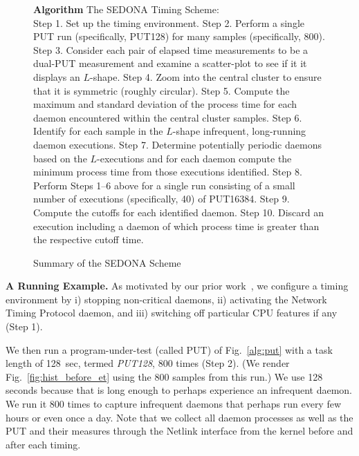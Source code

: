 \documentclass[letter]{ieice}
\begin{document}
\begin{figure}[h]
\begin{center}
\begin{algorithmic}
{\bf Algorithm} The SEDONA Timing Scheme: \\
\STATE Step 1. Set up the timing environment.
\STATE Step 2. Perform a single PUT run (specifically, PUT128) for many samples (specifically, 800).
\STATE Step 3. Consider each pair of elapsed time measurements to be a
dual-PUT measurement 
and examine a scatter-plot to see if it it displays an $L$-shape.
\STATE Step 4. Zoom into the central cluster to ensure that it is symmetric (roughly circular).
\STATE Step 5. Compute the maximum and standard deviation of the process time 
for each daemon encountered within the central cluster samples.
\STATE Step 6. Identify for each sample in the $L$-shape infrequent, long-running daemon executions. 
\STATE Step 7. Determine potentially periodic daemons based on the $L$-executions 
and for each daemon compute the minimum process time from those executions identified. 
\STATE Step 8. Perform Steps 1--6 above for a single run 
consisting of a small number of executions (specifically, 40) of PUT16384.  
\STATE Step 9. Compute the cutoffs for each identified daemon. 
\STATE Step 10. Discard an execution including a daemon of which process
time is greater than the respective cutoff time.
\end{algorithmic}
\end{center}
\caption{Summary of the SEDONA Scheme\label{alg:find}}
\vspace{-0.28in}
\end{figure}
%


{\bf A Running Example.} 
As motivated by our prior work~\cite{Currim}, 
we configure a timing environment by i) stopping non-critical daemons, 
ii) activating the Network Timing Protocol daemon, and 
iii) switching off particular CPU features\cite{intel15,intelSpeed15} if any (Step 1). 

We then run a program-under-test (called PUT) of 
Fig.~\ref{alg:put} with a task length of 128~sec, 
termed {\em PUT128}, 800 times (Step 2). 
(We render Fig.~\ref{fig:hist_before_et} using the 800 samples from this run.)
We use 128 seconds because that is long enough to perhaps experience an infrequent daemon. 
We run it 800 times to capture infrequent daemons that perhaps run every few hours or even 
once a day. 
Note that we collect all daemon processes as well as the PUT and their measures 
through the Netlink interface from the kernel before and after each 
timing.
\end{document}
